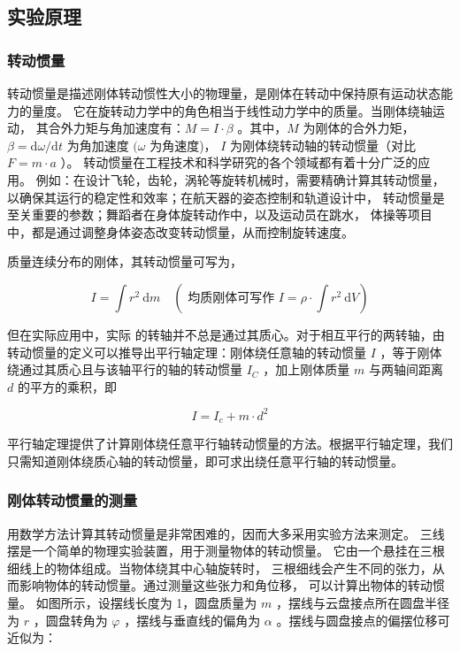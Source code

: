 \documentclass{article}
\begin{document}
\subsection{实验原理}
\subsubsection{转动惯量}  
转动惯量是描述刚体转动惯性大小的物理量，是刚体在转动中保持原有运动状态能力的量度。
它在旋转动力学中的角色相当于线性动力学中的质量。当刚体绕轴运动，
其合外力矩与角加速度有：$M=I \cdot \beta$ 。其中，$M$ 为刚体的合外力矩，
$\beta=\mathrm{d} \omega / \mathrm{d} t$ 为角加速度 $(\omega$ 为角速度)，
$I$ 为刚体绕转动轴的转动惯量（对比 $F=m \cdot a$ ）。
转动惯量在工程技术和科学研究的各个领域都有着十分广泛的应用。
例如：在设计飞轮，齿轮，涡轮等旋转机械时，需要精确计算其转动惯量，
以确保其运行的稳定性和效率；在航天器的姿态控制和轨道设计中，
转动惯量是至关重要的参数；舞蹈者在身体旋转动作中，以及运动员在跳水，
体操等项目中，都是通过调整身体姿态改变转动惯量，从而控制旋转速度。

质量连续分布的刚体，其转动惯量可写为，

$$
I=\int r^2 \mathrm{~d} m \quad\left(\text { 均质刚体可写作 } I=\rho \cdot \int r^2 \mathrm{~d} V\right)
$$

但在实际应用中，实际
的转轴并不总是通过其质心。对于相互平行的两转轴，由转动惯量的定义可以推导出平行轴定理：刚体绕任意轴的转动惯量 $I$ ，等于刚体绕通过其质心且与该轴平行的轴的转动惯量 $I_C$
，加上刚体质量 $m$ 与两轴间距离 $d$ 的平方的乘积，即

$$
I=I_c+m \cdot d^2
$$


平行轴定理提供了计算刚体绕任意平行轴转动惯量的方法。根据平行轴定理，我们只需知道刚体绕质心轴的转动惯量，即可求出绕任意平行轴的转动惯量。
    
\subsubsection{刚体转动惯量的测量}

    
    
    
    
    
用数学方法计算其转动惯量是非常困难的，因而大多采用实验方法来测定。
三线摆是一个简单的物理实验装置，用于测量物体的转动惯量。
它由一个悬挂在三根细线上的物体组成。当物体绕其中心轴旋转时，
三根细线会产生不同的张力，从而影响物体的转动惯量。通过测量这些张力和角位移，
可以计算出物体的转动惯量。
如图所示，设摆线长度为 1，圆盘质量为 $m$ ，摆线与云盘接点所在圆盘半径为 $r$ ，圆盘转角为 $\varphi$ ，摆线与垂直线的偏角为 $\alpha$ 。摆线与圆盘接点的偏摆位移可近似为：
\end{document}
